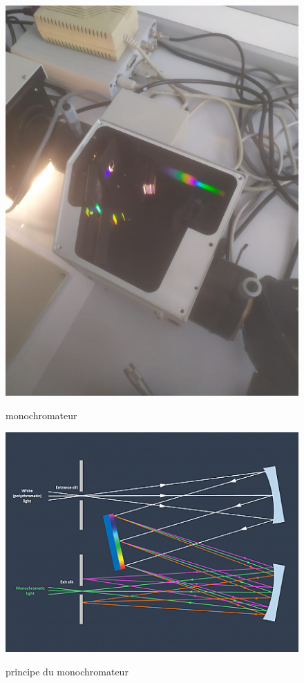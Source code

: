 \documentclass{article}
\begin{document}
\begin{figure}[H]
\centering
\includegraphics[scale=0.2]{monochromateur.jpg}
\label{fig:1}
\caption{monochromateur}
\end{figure}

\begin{figure}[H]
\centering
\includegraphics[scale=0.7]{monochromateur_principe.png}
\label{fig:2}
\caption{principe du monochromateur}
\end{figure}
\end{document}
